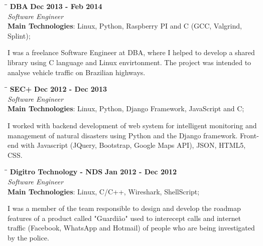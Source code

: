 \documentclass[margin]{res}
\begin{document}
\begin{resume}
\vspace{-0.1in}

\vspace{-0.1in}
   \begin{tabbing}
   \hspace{2.3in}\= \hspace{1.7in}\= \kill %
    \textbf{DBA}    \>\>\textbf{Dec 2013 - Feb 2014}\\
    \textit{Software Engineer}\\        
    \textbf{Main Technologies}: Linux, Python, Raspberry PI and C (GCC, Valgrind, Splint);
   \end{tabbing}\vspace{-20pt}      %
    \vspace{2mm}
        I was a freelance Software Engineer at DBA, where I helped to develop
        a shared library using C language and Linux envirtonment. The project was intended to 
        analyse vehicle traffic on Brazilian highways.
\vspace{-0.1in}

   \begin{tabbing}
   \hspace{2.3in}\= \hspace{1.7in}\= \kill %
    \textbf{SEC+}    \>\>\textbf{Dec 2012 - Dec 2013}\\
    \textit{Software Engineer}\\        
    \textbf{Main Technologies}: Linux, Python, Django Framework, JavaScript and C;
   \end{tabbing}\vspace{-20pt}      %
    \vspace{2mm}
     I worked with backend development of web system for intelligent monitoring 
     and management of natural disasters using Python and the Django framework. 
     Front-end with Javascript (JQuery, Bootstrap, Google Maps API),
     JSON, HTML5, CSS.

   \begin{tabbing}
   \hspace{2.3in}\= \hspace{1.7in}\= \kill %
    \textbf{Digitro Technology - NDS}    \>\>\textbf{Jan 2012 - Dec 2012}\\
    \textit{Software Engineer}\\   
    \textbf{Main Technologies}: Linux, C/C++, Wireshark, ShellScript;
   \end{tabbing}\vspace{-20pt}      %
    \vspace{2mm}
    I was a member of the team responsible to design and develop the roadmap features of a product called
    "Guardião" used to interecept calls and internet traffic (Facebook, WhatsApp and Hotmail) of people who are        being investigated by the police.


\end{resume}
\end{document}
